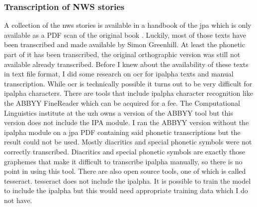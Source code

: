 \subsubsection*{Transcription of NWS stories}
A collection of the \ac{nws} stories is available in a handbook of the \ac{jpa} which is only available as a PDF scan of the original book . Luckily, most of those texts have been transcribed and made available by Simon Greenhill. At least the phonetic part of it has been transcribed, the original orthographic version was still not available already transcribed. Before I knew about the availability of these texts in text file format, I did some research on \ac{ocr} for \ac{ipalpha} texts and manual transcription. While \ac{ocr} is technically possible it turns out to be very difficult for \ac{ipalpha} characters. There are tools that include \ac{ipalpha} character recognition like the ABBYY FineReader which can be acquired for a fee. The Computational Linguistics institute at the \ac{uzh} owns a version of the ABBYY tool but this version does not include the IPA module. I ran the ABBYY version without the \ac{ipalpha} module on a \ac{jpa} PDF containing said phonetic transcriptions but the result could not be used. Mostly diacritics and special phonetic symbols were not correctly transcribed. Diacritics and special phonetic symbols are exactly those graphemes that make it difficult to transcribe \ac{ipalpha} manually, so there is no point in using this tool. There are also open source tools, one of which is called tesseract. tesseract does not include the \ac{ipalpha}. It is possible to train the model to include the \ac{ipalpha} but this would need appropriate training data which I do not have.

